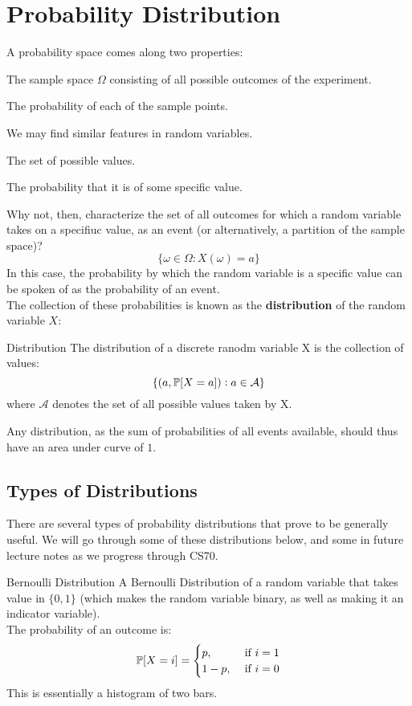\section{Probability Distribution}
A probability space comes along two properties:
\begin{bindenum}
    \item The sample space $\Omega$ consisting of all possible outcomes of the experiment.
    \item The probability of each of the sample points.
\end{bindenum}
We may find similar features in random variables.
\begin{bindenum}
    \item The set of possible values.
    \item The probability that it is of some specific value.
\end{bindenum}
Why not, then, characterize the set of all outcomes for which a random variable takes on a specifiuc value, as an event (or alternatively, a partition of the sample space)?
\[\{\omega \in \Omega: X(\omega) = a\}\]
In this case, the probability by which the random variable is a specific value can be spoken of as the probability of an event. \\
The collection of these probabilities is known as the \textbf{distribution} of the random variable $X$:
\begin{ln-define}{Distribution}{}
    The distribution of a discrete ranodm variable X is the collection of values:
    \[\{(a, \P[X = a]) : a \in \mathcal{A}\}\]
    where $\mathcal{A}$ denotes the set of all possible values taken by X.
\end{ln-define}
Any distribution, as the sum of probabilities of all events available, should thus have an area under curve of $1$.

\subsection{Types of Distributions}
There are several types of probability distributions that prove to be generally useful. We will go through some of these distributions below, and some in future lecture notes as we progress through CS70.
\begin{ln-define}{Bernoulli Distribution}{}
    A Bernoulli Distribution of a random variable that takes value in $\{0, 1\}$ (which makes the random variable binary, as well as making it an indicator variable). \\
    The probability of an outcome is:
    \[
        \P[X = i] =
        \begin{cases}
            p, &\text{ if $i = 1$} \\
            1 - p, &\text{ if $i = 0$}
        \end{cases}
    \]
    This is essentially a histogram of two bars.
\end{ln-define}


